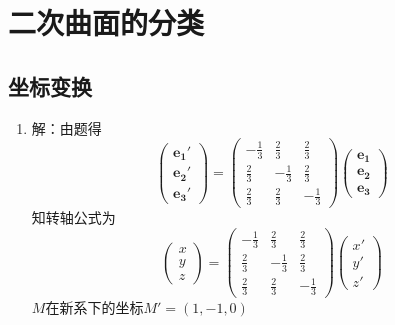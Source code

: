 \documentclass[UTF8]{ctexart}
\begin{document}
\section{二次曲面的分类}
\subsection{坐标变换}
\begin{enumerate}
\item 解：由题得
$$\left(\begin{array}{c}\mathbf{e_1}'\\\mathbf{e_2}'\\\mathbf{e_3}'\end{array}\right)=\left(\begin{array}{ccc}\displaystyle-\frac{1}{3}&\displaystyle\frac{2}{3}&\displaystyle\frac{2}{3}\\\displaystyle\frac{2}{3}&\displaystyle-\frac{1}{3}&\displaystyle\frac{2}{3}\\\displaystyle\frac{2}{3}&\displaystyle\frac{2}{3}&\displaystyle-\frac{1}{3}\end{array}\right)\left(\begin{array}{c}\mathbf{e_1}\\\mathbf{e_2}\\\mathbf{e_3}\end{array}\right)$$
知转轴公式为
$$\left(\begin{array}{c}x\\y\\z\end{array}\right)=\left(\begin{array}{ccc}\displaystyle-\frac{1}{3}&\displaystyle\frac{2}{3}&\displaystyle\frac{2}{3}\\\displaystyle\frac{2}{3}&\displaystyle-\frac{1}{3}&\displaystyle\frac{2}{3}\\\displaystyle\frac{2}{3}&\displaystyle\frac{2}{3}&\displaystyle-\frac{1}{3}\end{array}\right)\left(\begin{array}{c}x'\\y'\\z'\end{array}\right)$$
$M$在新系下的坐标$M'=\left(1,-1,0\right)$


\end{enumerate}
\end{document}
